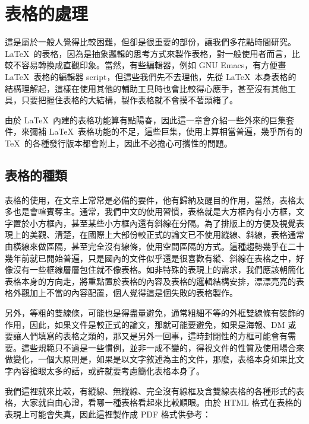 
\chapter{表格的處理}
\label{ch:table}

這是屬於一般人覺得比較困難，但卻是很重要的部份，讓我們多花點時間研究。\LaTeX\ 的表格，因為是抽象邏輯的思考方式來製作表格，對一般使用者而言，比較不容易轉換成直觀印象。當然，有些編輯器，例如 GNU Emacs，有方便畫 \LaTeX\ 表格的編輯器 script，但這些我們先不去理他，先從 \LaTeX\ 本身表格的結構理解起，這樣在使用其他的輔助工具時也會比較得心應手，甚至沒有其他工具，只要把握住表格的大結構，製作表格就不會摸不著頭緒了。

由於 \LaTeX\ 內建的表格功能算有點陽春，因此這一章會介紹一些外來的巨集套件，來彌補 \LaTeX\ 表格功能的不足，這些巨集，使用上算相當普遍，幾乎所有的 \TeX\ 的各種發行版本都會附上，因此不必擔心可攜性的問題。

\section{表格的種類}

表格的使用，在文章上常常是必備的要件，他有歸納及醒目的作用，當然，表格太多也是會喧賓奪主。通常，我們中文的使用習慣，表格就是大方框內有小方框，文字置於小方框內，甚至某些小方框內還有斜線在分隔。為了排版上的方便及視覺表現上的美觀、清楚，在國際上大部份較正式的論文已不使用縱線、斜線，表格通常由橫線來做區隔，甚至完全沒有線條，使用空間區隔的方式。這種趨勢幾乎在二十幾年前就已開始普遍，只是國內的文件似乎還是很喜歡有縱、斜線在表格之中，好像沒有一些框線層層包住就不像表格。如非特殊的表現上的需求，我們應該朝簡化表格本身的方向走，將重點置於表格的內容及表格的邏輯結構安排，漂漂亮亮的表格外觀加上不當的內容配置，個人覺得這是個失敗的表格製作。

另外，等粗的雙線條，可能也是得盡量避免，通常粗細不等的外框雙線條有裝飾的作用，因此，如果文件是較正式的論文，那就可能要避免，如果是海報、DM 或要讓人們填寫的表格之類的，那又是另外一回事，這時封閉性的方框可能會有需要。這些規範只不過是一些慣例，並非一成不變的，得視文件的性質及使用場合來做變化，一個大原則是，如果是以文字敘述為主的文件，那麼，表格本身如果比文字內容搶眼太多的話，或許就要考慮簡化表格本身了。

我們這裡就來比較，有縱線、無縱線、完全沒有線框及含雙線表格的各種形式的表格，大家就自由心證，看哪一種表格看起來比較順眼。由於 HTML 格式在表格的表現上可能會失真，因此這裡製作成 PDF 格式供參考：


